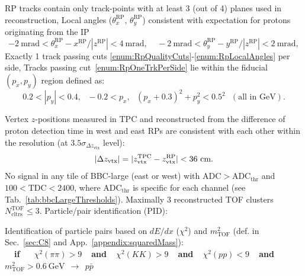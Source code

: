 \begin{enumerate}[label=\textbf{\hyperref[sec:C\arabic*]{C\arabic*}},ref=C\arabic*]
      \begin{enumerate}[label=\textbf{\theenumi.\arabic*},ref=\theenumi.\arabic*]
      \itemm RP tracks contain only track-points with at least 3 (out of 4) planes used in reconstruction,\label{enum:RpQualityCuts}
      \itemm Local angles ($\theta_{x}^{\text{RP}}$, $\theta_{y}^{\text{RP}}$) consistent with expectation for protons originating from the IP\label{enum:RpLocalAngles}%
      \[-2~\text{mrad}<\theta_{x}^{\text{RP}}-x^{\text{RP}}/|z^{\text{RP}}|<4~\text{mrad},~~~~~-2~\text{mrad}<\theta_{y}^{\text{RP}}-y^{\text{RP}}/|z^{\text{RP}}|<2~\text{mrad},\]
      \itemm Exactly 1 track passing cuts \ref{enum:RpQualityCuts}-\ref{enum:RpLocalAngles} per side,\label{enum:RpOneTrkPerSide}
      \itemm Tracks passing cut~\ref{enum:RpOneTrkPerSide} lie within the fiducial $(p_{x},p_{y})$ region defined as\vspace*{-7pt}\label{enum:RpFiducial}:\\
      \[0.2<|p_{y}|<0.4,~~~-0.2<p_{x},~~~(p_{x}+0.3)^{2}+p_{y}^{2}<0.5^{2}~~~(\text{all in GeV}).\]
    \end{enumerate}
 \itemm Vertex $z$-positions measured in TPC and reconstructed from the difference of proton detection time in west and east RPs are consistent with each other within the resolution (at $3.5\sigma_{\Delta z_{\text{vtx}}}$ level):
 \[|\Delta z_{\text{vtx}}| = |z_{\text{vtx}}^{\text{TPC}}-z_{\text{vtx}}^{\text{RP}}|<36~\text{cm}.\vspace{-17pt}\]\label{enum:CutDeltaZVx}
 \itemm No signal in any tile of BBC-large (east or west) with $\text{ADC}>\text{ADC}_{\text{thr}}$ and $100<\text{TDC}<2400$, where $\text{ADC}_{\text{thr}}$ is specific for each channel (see Tab.~\ref{tab:bbcLargeThresholds}).\label{enum:CutBbcLarge}%
 \itemm Maximally 3 reconstructed TOF clusters $N^{\text{TOF}}_{\text{cltrs}}\leq 3$.\label{enum:CutTofClusters}%
 \itemm Particle/pair identification (PID):\label{enum:CutPid}
 \begin{enumerate}[label=\textbf{\theenumi.\arabic*},ref=\theenumi.\arabic*]
      \itemm Identification of particle pairs based on $dE/dx$ ($\chi^{2}$) and $m^{2}_{\text{TOF}}$ (def. in Sec.~\ref{sec:C8} and App.~\ref{appendix:squaredMass}):\label{enum:CutPidNoPtLimit}\\[3pt]
        \textbf{~~if~~~}\hspace*{4.5pt}$\chi^{2}(\pi\pi)>9$\textbf{~~and~~}$\chi^{2}(KK)>9$\textbf{~~and~~}$\chi^{2}(pp)<9$\textbf{~~and~~}$m^{2}_{\text{TOF}}>0.6~\text{GeV}~~\rightarrow~~p\bar{p}$\\[5pt]%

\end{enumerate}
\end{enumerate}
